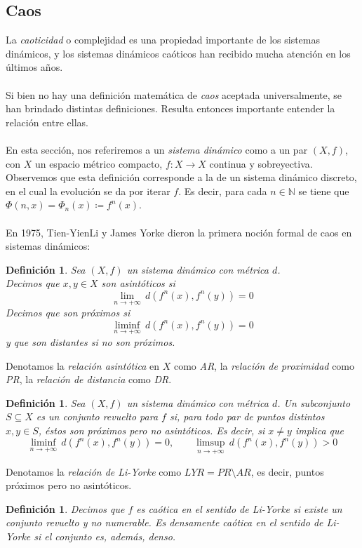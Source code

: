 \documentclass[12pt,a4paper]{article}
\newtheorem{definition}[theorem]{Definición}
\begin{document}
\subsection{Caos}
La \textit{caoticidad} o complejidad es una propiedad importante de los sistemas dinámicos, y los sistemas dinámicos caóticos han recibido mucha atención en los últimos años.
\\
\\
Si bien no hay una definición matemática de \textit{caos} aceptada universalmente, se han brindado distintas definiciones. Resulta entonces importante entender la relación entre ellas.
\\
\\
En esta sección, nos referiremos a un \textit{sistema dinámico} como a un par $(X,f)$, con $X$ un espacio métrico compacto, $f: X \rightarrow X$ continua y sobreyectiva.
\\
Observemos que esta definición corresponde a la de un sistema dinámico discreto, en el cual la evolución se da por iterar $f$. Es decir, para cada $n \in \mathbb{N}$ se tiene que $\Phi(n,x) = \Phi_n(x) \coloneqq f^n(x)$. 
\\
\\
En 1975, Tien-YienLi y James Yorke dieron la primera noción formal de caos en sistemas dinámicos:
\begin{definition}
Sea $(X,f)$ un sistema dinámico con métrica $d$.
\\
Decimos que $x, y \in X$ son asintóticos si 
\[
\lim_{n \rightarrow +\infty} \, d(f^n(x), f^n(y))=0
\]
Decimos que son próximos si
\[
\liminf_{n \rightarrow +\infty} \, d(f^n(x), f^n(y))=0
\]
y que son distantes si no son próximos.
\end{definition}
Denotamos la \textit{relación asintótica} en $X$ como \textit{AR}, la \textit{relación de proximidad} como \textit{PR}, la \textit{relación de distancia} como \textit{DR}.
\begin{definition}
Sea $(X,f)$ un sistema dinámico con métrica $d$. Un subconjunto $S \subseteq X$ es un conjunto revuelto para $f$ si, para todo par de puntos distintos $x, y \in S$, éstos son próximos pero no asintóticos. Es decir, si $x \neq y$ implica que
\[
\liminf_{n \rightarrow +\infty} \, d(f^n(x), f^n(y))=0, \qquad \limsup_{n \rightarrow +\infty} \, d(f^n(x), f^n(y))>0
\]
\end{definition}
Denotamos la \textit{relación de Li-Yorke} como $LYR = PR \setminus AR$, es decir, puntos próximos pero no asintóticos.
\begin{definition}    
Decimos que $f$ es \textit{caótica en el sentido de Li-Yorke} si existe un conjunto revuelto y no numerable. Es \textit{densamente caótica en el sentido de Li-Yorke} si el conjunto es, además, denso.
\end{definition}
\end{document}
